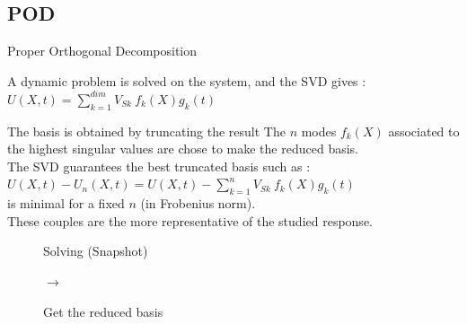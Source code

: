 \documentclass[10pt,a4paper]{beamer}
\begin{document}
\subsection{POD}

\begin{frame}{Proper Orthogonal Decomposition}
	
	\begin{exampleblock}{A dynamic problem is solved on the system, and the SVD gives :}
	$ \displaystyle U(X,t) = \sum_{k=1}^{dim} V_{Sk}~f_k(X) g_k(t)$\\
	\end{exampleblock}
		
	\begin{exampleblock}{The basis is obtained by truncating the result}
	The $n$ modes $f_k(X)$ associated to the highest 
	singular values are chose to make the reduced basis.\\
	The SVD guarantees the best truncated basis such as :
	$ \displaystyle U(X,t) - U_n(X,t) = U(X,t) - \sum_{k=1}^{n} V_{Sk}~ f_k(X) g_k(t)$\\
	is minimal for a fixed $n$ (in Frobenius norm).\\
	These couples are the more representative of the studied response.
	\end{exampleblock}
	\vspace{-0.3cm}
	\begin{figure}
	   \begin{minipage}{0.22\linewidth}
			\begin{exampleblock}{}
				\centering		
				Solving (Snapshot)
			\end{exampleblock}
	   \end{minipage}\hfill
	   \begin{minipage}{0.03\linewidth}
			\vspace{0.220cm}
	   		$\rightarrow$
	   \end{minipage}\hfill
	   \begin{minipage}{0.22\linewidth}
			\begin{exampleblock}{}
				\centering		
				Get the reduced basis
			\end{exampleblock}
	   \end{minipage}\hfill
	   \begin{minipage}{0.03\linewidth}
			\vspace{0.220cm}

\end{minipage}
\end{figure}
\end{frame}
\end{document}
